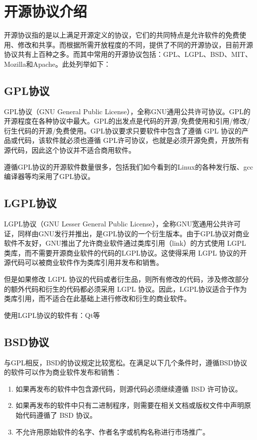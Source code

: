 \documentclass[UTF8]{ctexart}
\begin{document}
\section{开源协议介绍}
开源协议指的是以上满足开源定义的协议，它们的共同特点是允许软件的免费使用、修改和共享。而根据所需开放程度的不同，提供了不同的开源协议，目前开源协议共有上百种之多。而其中常用的开源协议包括：GPL、LGPL、BSD、MIT、Mozilla和Apache。此处列举如下：\cite{opensourceinit}\cite{runoob}\cite{zhihuOpenSource}
\subsection{GPL协议}
GPL协议（GNU General Public License），全称GNU通用公共许可协议。GPL的开源程度在各种协议中最大。GPL的出发点是代码的开源/免费使用和引用/修改/衍生代码的开源/免费使用。GPL协议要求只要软件中包含了遵循 GPL 协议的产品或代码，该软件就必须也遵循 GPL许可协议，也就是必须开源免费，开放所有源代码，因此这个协议并不适合商用软件。

遵循GPL协议的开源软件数量很多，包括我们如今看到的Linux的各种发行版、gcc编译器等均采用了GPL协议。
\subsection{LGPL协议}
LGPL协议（GNU Lesser General Public License），全称GNU宽通用公共许可证，同样由GNU发行并推出，是GPL协议的一个衍生版本。由于GPL协议对商业软件不友好，GNU推出了允许商业软件通过类库引用（link）的方式使用 LGPL 类库，而不需要开源商业软件的代码的LGPL协议。这使得采用 LGPL 协议的开源代码可以被商业软件作为类库引用并发布和销售。

但是如果修改 LGPL 协议的代码或者衍生品，则所有修改的代码，涉及修改部分的额外代码和衍生的代码都必须采用 LGPL 协议。因此，LGPL协议适合于作为类库引用，而不适合在此基础上进行修改和衍生的商业软件。

使用LGPL协议的软件有：Qt等
\subsection{BSD协议}
与GPL相反，BSD的协议规定比较宽松。在满足以下几个条件时，遵循BSD协议的软件可以作为商业软件发布和销售：
\begin{enumerate}
    \item 如果再发布的软件中包含源代码，则源代码必须继续遵循 BSD 许可协议。
    \item 如果再发布的软件中只有二进制程序，则需要在相关文档或版权文件中声明原始代码遵循了 BSD 协议。
    \item 不允许用原始软件的名字、作者名字或机构名称进行市场推广。
\end{enumerate}
\end{document}
